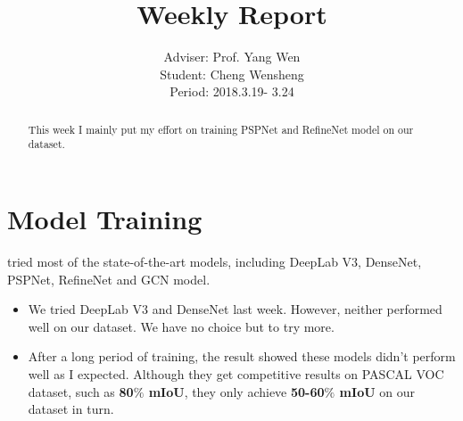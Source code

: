 \documentclass[]{IEEEtran}
\begin{document}
	\title{Weekly Report}
	\author{Adviser: Prof. Yang Wen \\Student: Cheng Wensheng\\ Period: 2018.3.19- 3.24
	}
	\maketitle

\begin{abstract}
	This week I mainly put my effort on training PSPNet and RefineNet model on our dataset.
\end{abstract}

\section{Model Training}
	 tried most of the state-of-the-art models, including DeepLab V3, DenseNet, PSPNet, RefineNet and GCN model.
	\begin{itemize}
		\item We tried DeepLab V3 and DenseNet last week. However, neither performed well on our dataset. We have no choice but to try more.
		\item After a long period of training, the result showed these models didn't perform well as I expected. Although they get competitive results on PASCAL VOC dataset, such as \textbf{80$\%$ mIoU}, they only achieve \textbf{50-60$\%$ mIoU} on our dataset in turn.
	\end{itemize}

\end{document}
